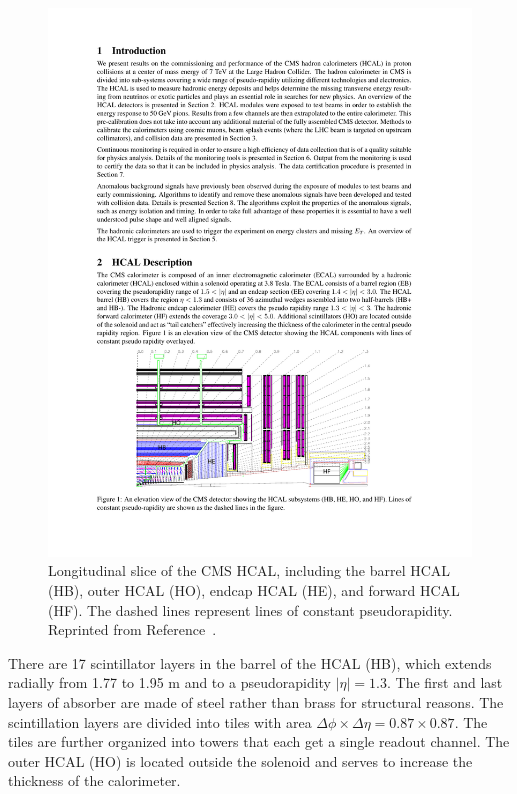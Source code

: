 
\begin{figure}[h!]
	\centering
	\includegraphics[width=\linewidth]{Figures/Detector/HCAL_layout.pdf}
       \caption{Longitudinal slice of the CMS HCAL, including the barrel HCAL (HB), outer HCAL (HO), endcap HCAL (HE), and forward HCAL (HF). The dashed lines represent lines of constant pseudorapidity. Reprinted from Reference~\cite{Chatrchyan2008zzk}.}
       \label{fig:HCAL_layout}
\end{figure}

There are 17 scintillator layers in the barrel of the HCAL (HB), which extends radially from 1.77 to 1.95 m and to a pseudorapidity $|\eta| = 1.3$. The first and last layers of absorber are made of steel rather than brass for structural reasons. The scintillation layers are divided into tiles with area $\Delta\phi \times \Delta\eta = 0.87 \times 0.87$. The tiles are further organized into towers that each get a single readout channel. The outer HCAL (HO) is located outside the solenoid and serves to increase the thickness of the calorimeter. 

